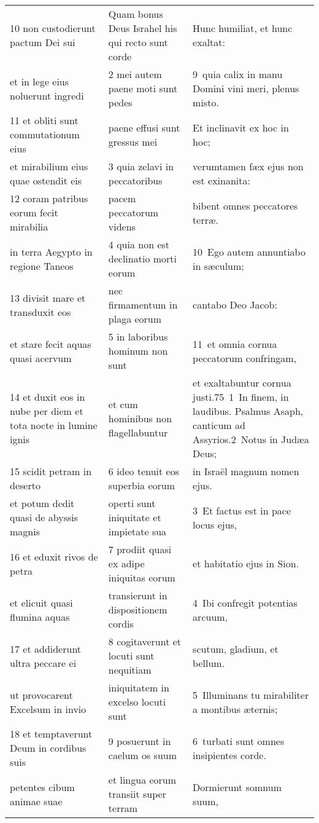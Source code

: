 \documentclass{article}
\begin{document}
\begin{longtable}{@{}p{}p{}p{}@{}}
10 non custodierunt pactum Dei sui	&	Quam bonus Deus Israhel his qui recto sunt corde	&	Hunc humiliat, et hunc exaltat:	\\
et in lege eius noluerunt ingredi	&	2 mei autem paene moti sunt pedes	&	9 quia calix in manu Domini vini meri, plenus misto.	\\
11 et obliti sunt commutationum eius	&	paene effusi sunt gressus mei	&	Et inclinavit ex hoc in hoc;	\\
et mirabilium eius quae ostendit eis	&	3 quia zelavi in peccatoribus	&	verumtamen fæx ejus non est exinanita:	\\
12 coram patribus eorum fecit mirabilia	&	pacem peccatorum videns	&	bibent omnes peccatores terræ.	\\
in terra Aegypto in regione Taneos	&	4 quia non est declinatio morti eorum	&	10 Ego autem annuntiabo in sæculum;	\\
13 divisit mare et transduxit eos	&	nec firmamentum in plaga eorum	&	cantabo Deo Jacob:	\\
et stare fecit aquas quasi acervum	&	5 in laboribus hominum non sunt	&	11 et omnia cornua peccatorum confringam,	\\
14 et duxit eos in nube per diem et tota nocte in lumine ignis	&	et cum hominibus non flagellabuntur	&	et exaltabuntur cornua justi.75 1 In finem, in laudibus. Psalmus Asaph, canticum ad Assyrios.2 Notus in Judæa Deus;	\\
15 scidit petram in deserto	&	6 ideo tenuit eos superbia eorum	&	in Israël magnum nomen ejus.	\\
et potum dedit quasi de abyssis magnis	&	operti sunt iniquitate et impietate sua	&	3 Et factus est in pace locus ejus,	\\
16 et eduxit rivos de petra	&	7 prodiit quasi ex adipe iniquitas eorum	&	et habitatio ejus in Sion.	\\
et elicuit quasi flumina aquas	&	transierunt in dispositionem cordis	&	4 Ibi confregit potentias arcuum,	\\
17 et addiderunt ultra peccare ei	&	8 cogitaverunt et locuti sunt nequitiam	&	scutum, gladium, et bellum.	\\
ut provocarent Excelsum in invio	&	iniquitatem in excelso locuti sunt	&	5 Illuminans tu mirabiliter a montibus æternis;	\\
18 et temptaverunt Deum in cordibus suis	&	9 posuerunt in caelum os suum	&	6 turbati sunt omnes insipientes corde.	\\
petentes cibum animae suae	&	et lingua eorum transiit super terram	&	Dormierunt somnum suum,	\\

\end{longtable}
\end{document}
